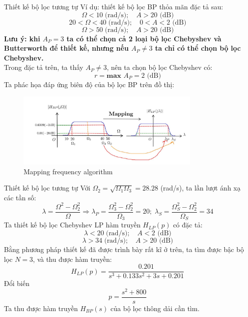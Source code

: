 \documentclass[8pt]{beamer}
\begin{document}
\begin{frame}{Thiết kế bộ lọc tương tự}
Ví dụ: thiết kế bộ lọc BP thỏa mãn đặc tả sau:
$$\Omega<10\;\text{(rad/s)};\quad A>20\text{ (dB)}$$
$$20<\Omega<40\;\text{(rad/s)};\quad 0<A<2\text{ (dB)}$$
$$\Omega>50\;\text{(rad/s)};\quad A>20\text{ (dB)}$$
\textbf{Lưu ý: khi $A_{P}=3$ ta có thể chọn cả 2 loại bộ lọc Chebyshev và Butterworth để thiết kế, nhưng nếu $A_{P}\neq3$ ta chỉ có thể chọn bộ lọc Chebyshev.}
\\Trong đặc tả trên, ta thấy $A_{P}\neq3$, nên ta chọn bộ lọc Chebyshev có: $$r=\textbf{max }A_{P}=2\text{ (dB)}$$
Ta phác họa đáp ứng biên độ của bộ lọc BP trên đồ thị:
\begin{figure}[h]
	\includegraphics[width=0.8\textwidth]{19.jpg}
	\caption{Mapping frequency algorithm}			\label{fig:re2}
		\end{figure}

\end{frame}
\begin{frame}{Thiết kế bộ lọc tương tự}
Với $\Omega_{2}=\sqrt{\Omega_{1}\Omega_{3}}=28.28$ (rad/s),
ta lần lượt ánh xạ các tần số: $$\lambda=\frac{\Omega^2-\Omega_{2}^2}{\Omega}\Rightarrow \lambda_{P}=\frac{\Omega_{3}^2-\Omega_{2}^2}{\Omega_{3}}=20;\;\lambda_{S}=\frac{\Omega_{S}^2-\Omega_{2}^2}{\Omega_{S}}=34$$
 Ta thiết kế bộ lọc Chebyshev LP hàm truyền $H_{LP}(p)$ có đặc tả:
$$\lambda<20\;\text{(rad/s)};\quad A<2\text{ (dB)}$$
$$\lambda>34\;\text{(rad/s)};\quad A>20\text{ (dB)}$$
Bằng phương pháp thiết kế đã được trình bày rất kĩ ở trên, ta tìm được bậc bộ lọc $N=3$, và thu được hàm truyền:
$$H_{LP}(p)=\frac{0.201}{s^3+0.133s^2+3s+0.201}$$
Đổi biến $$p=\frac{s^2+800}{s}$$
Ta thu được hàm truyền $H_{BP}(s)$ của bộ lọc thông dải cần tìm.
\end{frame}
\end{document}
